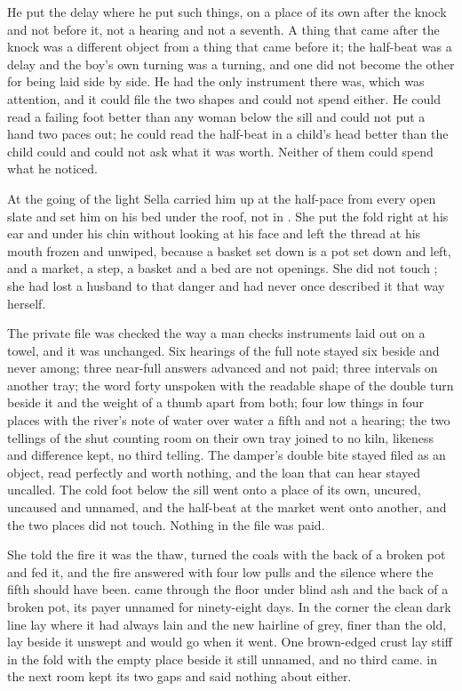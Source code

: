 He put the delay where he put such things, on a place of its own after the knock and not before it, not a hearing and not a seventh. A thing that came after the knock was a different object from a thing that came before it; the half-beat was a delay and the boy's own turning was a turning, and one did not become the other for being laid side by side. He had the only instrument there was, which was attention, and it could file the two shapes and could not spend either. He could read a failing foot better than any woman below the sill and could not put a hand two paces out; he could read the half-beat in a child's head better than the child could and could not ask what it was worth. Neither of them could spend what he noticed.

\scenebreak

At the going of the light Sella carried him up  at the half-pace from every open slate and set him on his bed under the  roof, not in . She put the fold right at his ear and under his chin without looking at his face and left the thread at his mouth frozen and unwiped, because a basket set down is a pot set down and left, and a market, a step, a basket and a bed are not openings. She did not touch ; she had lost a husband to that danger and had never once described it that way herself.

The private file was checked the way a man checks instruments laid out on a towel, and it was unchanged. Six hearings of the full note stayed six beside and never among; three near-full answers advanced and not paid; three intervals on another tray; the word forty unspoken with the readable shape of the double turn beside it and the weight of a thumb apart from both; four low things in four places with the river's note of water over water a fifth and not a hearing; the two tellings of the shut counting room on their own tray joined to no kiln, likeness and difference kept, no third telling. The damper's double bite stayed filed as an object, read perfectly and worth nothing, and the loan that can hear stayed uncalled. The cold foot below the sill went onto a place of its own, uncured, uncaused and unnamed, and the half-beat at the market went onto another, and the two places did not touch. Nothing in the file was paid.

She told the fire it was the thaw, turned the coals with the back of a broken pot and fed it, and the fire answered with four low pulls and the silence where the fifth should have been.  came through the floor under blind ash and the back of a broken pot, its payer unnamed for ninety-eight days. In the corner the clean dark line lay where it had always lain and the new hairline of grey, finer than the old, lay beside it unswept and would go when it went. One brown-edged crust lay stiff in the fold with the empty place beside it still unnamed, and no third came.  in the next room kept its two gaps and said nothing about either.

